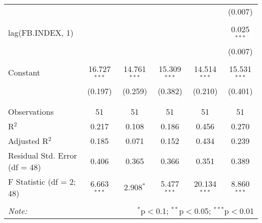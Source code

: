 \documentclass[12pt,english]{article}
\begin{document}
\begin{table}[!htbp]
{\begin{tabular}{@{\extracolsep{5pt}}lccccc}
  &  &  &  &  & (0.007) \\ 
  & & & & & \\ 
 lag(FB.INDEX, 1) &  &  &  &  & 0.025$^{***}$ \\ 
  &  &  &  &  & (0.007) \\ 
  & & & & & \\ 
 Constant & 16.727$^{***}$ & 14.761$^{***}$ & 15.309$^{***}$ & 14.514$^{***}$ & 15.531$^{***}$ \\ 
  & (0.197) & (0.259) & (0.382) & (0.210) & (0.401) \\ 
  & & & & & \\ 
\hline \\[-1.8ex] 
Observations & 51 & 51 & 51 & 51 & 51 \\ 
R$^{2}$ & 0.217 & 0.108 & 0.186 & 0.456 & 0.270 \\ 
Adjusted R$^{2}$ & 0.185 & 0.071 & 0.152 & 0.434 & 0.239 \\ 
Residual Std. Error (df = 48) & 0.406 & 0.365 & 0.366 & 0.351 & 0.389 \\ 
F Statistic (df = 2; 48) & 6.663$^{***}$ & 2.908$^{*}$ & 5.477$^{***}$ & 20.134$^{***}$ & 8.860$^{***}$ \\ 
\hline 
\hline \\[-1.8ex] 
\textit{Note:}  & \multicolumn{5}{r}{$^{*}$p$<$0.1; $^{**}$p$<$0.05; $^{***}$p$<$0.01} \\ 
\end{tabular} 
}
\end{table} 
\end{document}
